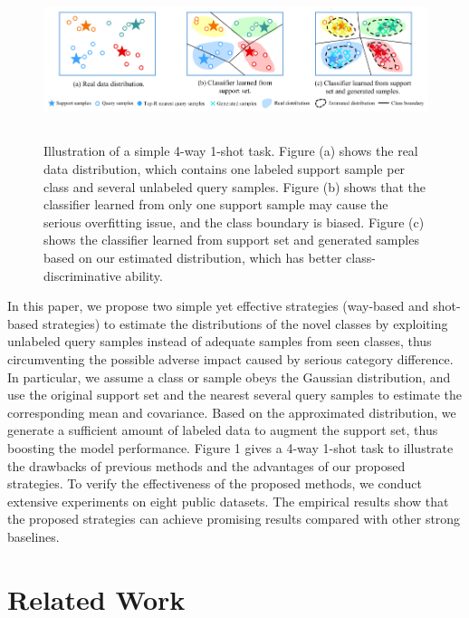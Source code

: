 \documentclass[letterpaper]{article} %
\begin{document}
\begin{figure}
	\centering
	\includegraphics[height=4.6cm]{figure/framework.pdf}
	\caption{Illustration of a simple 4-way 1-shot task. Figure (a) shows the real data distribution, which contains one labeled support sample per class and several unlabeled query samples. Figure (b) shows that the classifier learned from only one support sample may cause the serious overfitting issue, and the class boundary is biased. Figure (c) shows the classifier learned from support set and generated samples based on our estimated distribution, which has better class-discriminative ability.}
	\label{framework}
\end{figure}

In this paper, we propose two simple yet effective strategies (way-based and shot-based strategies) to estimate the distributions of the novel classes by exploiting unlabeled query samples instead of adequate samples from seen classes, thus circumventing the possible adverse impact caused by serious category difference. In particular, we assume a class or sample obeys the Gaussian distribution, and use the original support set and the nearest several query samples to estimate the corresponding mean and covariance. Based on the approximated distribution, we generate a sufficient amount of labeled data to augment the support set, thus boosting the model performance. Figure 1 gives a 4-way 1-shot task to illustrate the drawbacks of previous methods and the advantages of our proposed strategies. To verify the effectiveness of the proposed methods, we conduct extensive experiments on eight public datasets. The empirical results show that the proposed strategies can achieve promising results compared with other strong baselines.
 
\section{Related Work}
\end{document}
